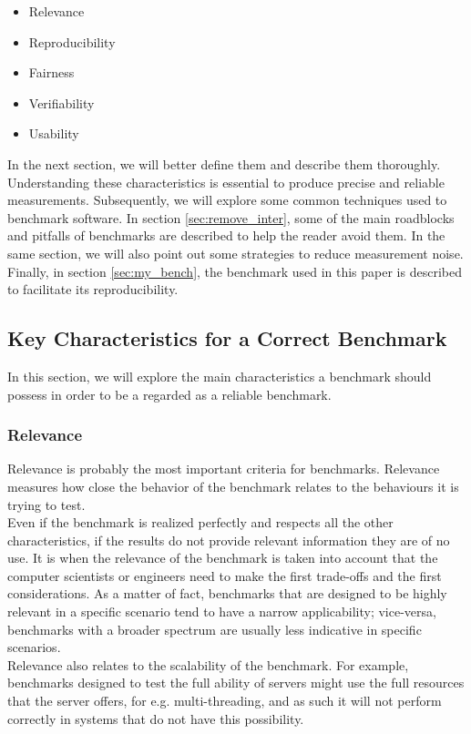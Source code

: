 \begin{itemize}
    \item Relevance
    \item Reproducibility
    \item Fairness
    \item Verifiability
    \item Usability
\end{itemize}
In the next section, we will better define them and describe them thoroughly. Understanding these characteristics is essential to produce precise and reliable measurements. Subsequently, we will explore some common techniques used to benchmark software. In section \ref{sec:remove_inter}, some of the main roadblocks and pitfalls of benchmarks are described to help the reader avoid them. In the same section, we will also point out some strategies to reduce measurement noise. Finally, in section \ref{sec:my_bench}, the benchmark used in this paper is described to facilitate its reproducibility. \\









\subsection{Key Characteristics for a Correct Benchmark}\label{key_char}
In this section, we will explore the main characteristics a benchmark should possess in order to be a regarded as a reliable benchmark.
\subsubsection{Relevance}
Relevance is probably the most important criteria for benchmarks. Relevance measures how close the behavior of the benchmark relates to the behaviours it is trying to test. \cite{how_to_bench}\\
Even if the benchmark is realized perfectly and respects all the other characteristics, if the results do not provide relevant information they are of no use. It is when the relevance of the benchmark is taken into account that the computer scientists or engineers need to make the first trade-offs and the first considerations. As a matter of fact, benchmarks that are designed to be highly relevant in a specific scenario tend to have a narrow applicability; vice-versa, benchmarks with a broader spectrum are usually less indicative in specific scenarios. \cite{how_to_bench}\\
Relevance also relates to the scalability of the benchmark. For example, benchmarks designed to test the full ability of servers might use the full resources that the server offers, for e.g. multi-threading, and as such it will not perform correctly in systems that do not have this possibility. \cite{how_to_bench}

